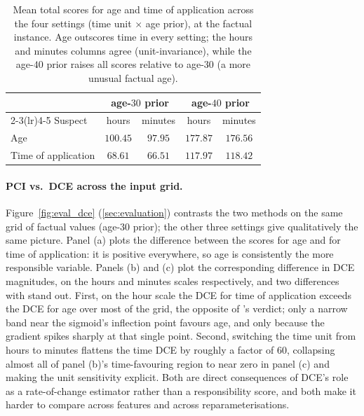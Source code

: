 \begin{table}[t]
\centering
\caption{Mean \ourapproach total scores for age and time of application across
the four settings (time unit $\times$ age prior), at the factual instance. Age
outscores time in every setting; the hours and minutes columns agree
(unit-invariance), while the age-$40$ prior raises all scores relative to
age-$30$ (a more unusual factual age).}
\label{tab:dce_means}
\vspace{4pt}
\begin{tabular}{l cc cc}
\toprule
& \multicolumn{2}{c}{age-$30$ prior} & \multicolumn{2}{c}{age-$40$ prior} \\
\cmidrule(lr){2-3}\cmidrule(lr){4-5}
Suspect & hours & minutes & hours & minutes \\
\midrule
Age                  & $100.45$ & $97.95$  & $177.87$ & $176.56$ \\
Time of application  & $68.61$  & $66.51$  & $117.97$ & $118.42$ \\
\bottomrule
\end{tabular}
\end{table}

\paragraph{PCI vs.\ DCE across the input grid.}
Figure~\ref{fig:eval_dce} (\cref{sec:evaluation}) contrasts the two methods on
the same grid of factual values (age-$30$ prior); the other three settings
give qualitatively the same picture. Panel (a) plots the difference between
the \ourapproach scores for age and for time of application: it is positive
everywhere, so age is consistently the more responsible variable. Panels (b)
and (c) plot the corresponding difference in DCE magnitudes, on the hours and
minutes scales respectively, and two differences with \ourapproach stand out.
First, on the hour scale the DCE for time of application exceeds the DCE for
age over most of the grid, the opposite of \ourapproach's verdict; only a
narrow band near the sigmoid's inflection point favours age, and only because
the gradient spikes sharply at that single point. Second, switching the time
unit from hours to minutes flattens the time DCE by roughly a factor of $60$,
collapsing almost all of panel (b)'s time-favouring region to near zero in
panel (c) and making the unit sensitivity explicit. Both are direct
consequences of DCE's role as a rate-of-change estimator rather than a
responsibility score, and both make it harder to compare across features and
across reparameterisations.

\FloatBarrier  %

